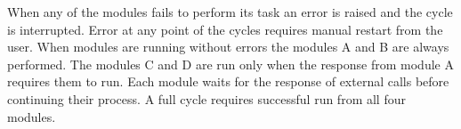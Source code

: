 When any of the modules fails to perform its task an error is raised and the cycle is interrupted.
Error at any point of the cycles requires manual restart from the user.
When modules are running without errors the modules A and B are always performed. 
The modules C and D are run only when the response from module A requires them to run.
Each module waits for the response of external calls before continuing their process.
A full cycle requires successful run from all four modules.
